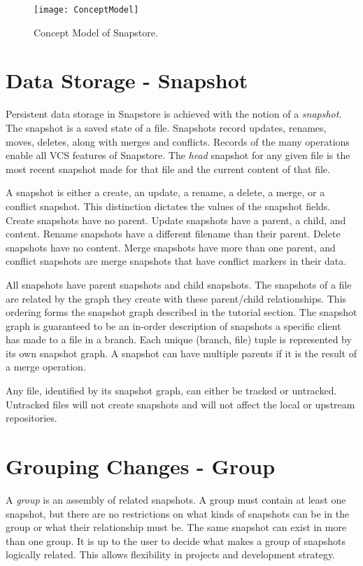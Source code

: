 \begin{figure}
\texttt{[image: ConceptModel]}
\caption{Concept Model of Snapstore.}
\label{arm:fig1}
\end{figure}

\section{Data Storage - Snapshot}

Persistent data storage in Snapstore is achieved with the notion of a \textit{snapshot}. The snapshot is a saved state of a file. Snapshots record updates, renames, moves, deletes, along with merges and conflicts. Records of the many operations enable all VCS features of Snapstore. The \textit{head} snapshot for any given file is the most recent snapshot made for that file and the current content of that file. 

A snapshot is either a create, an update, a rename, a delete, a merge, or a conflict snapshot. This distinction dictates the values of the snapshot fields. Create snapshots have no parent. Update snapshots have a parent, a child, and content. Rename snapshots have a different filename than their parent. Delete snapshots have no content. Merge snapshots have more than one parent, and conflict snapshots are merge snapshots that have conflict markers in their data.

All snapshots have parent snapshots and child snapshots. The snapshots of a file are related by the graph they create with these parent/child relationships. This ordering forms the snapshot graph described in the tutorial section. The snapshot graph is guaranteed to be an in-order description of snapshots a specific client has made to a file in a branch. Each unique (branch, file) tuple is represented by its own snapshot graph. A snapshot can have multiple parents if it is the result of a merge operation.

Any file, identified by its snapshot graph, can either be tracked or untracked. Untracked files will not create snapshots and will not affect the local or upstream repositories.

\section{Grouping Changes - Group}

A \textit{group} is an assembly of related snapshots. A group must contain at least one snapshot, but there are no restrictions on what kinds of snapshots can be in the group or what their relationship must be. The same snapshot can exist in more than one group. It is up to the user to decide what makes a group of snapshots logically related. This allows flexibility in projects and development strategy.

